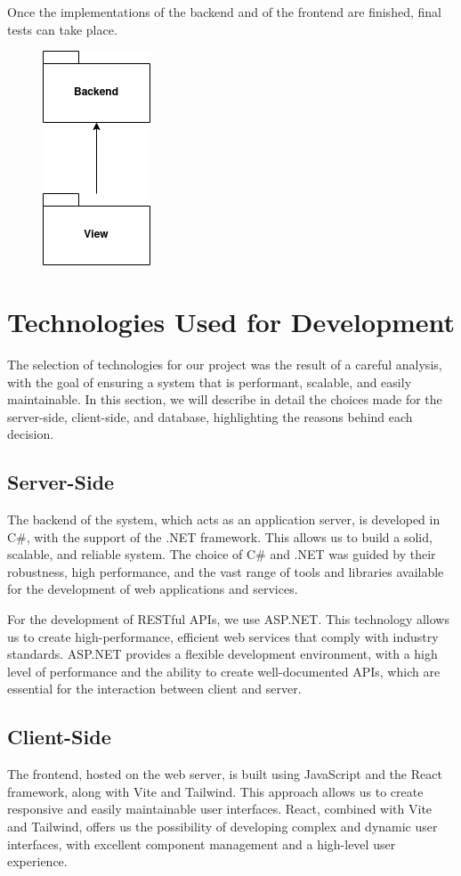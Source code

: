 Once the implementations of the backend and of the frontend are finished, final tests can take place.

\begin{figure}[H]
    \centering
    \includegraphics[width=0.1\linewidth]{../assets/implementation-plan-diagrams/implementation-plan-6.png}
\end{figure}



\section{Technologies Used for Development}
The selection of technologies for our project was the result of a careful analysis, 
with the goal of ensuring a system that is performant, scalable, and easily maintainable. 
In this section, we will describe in detail the choices made for the server-side, 
client-side, and database, highlighting the reasons behind each decision.

\subsection{Server-Side}
The backend of the system, which acts as an application server, is developed in C\#, 
with the support of the .NET framework. This allows us to build a solid, scalable, and reliable system.
The choice of C\# and .NET was guided by their robustness, high performance, and the vast 
range of tools and libraries available for the development of web applications and services.

For the development of RESTful APIs, we use ASP.NET. This technology allows us to create 
high-performance, efficient web services that comply with industry standards.
ASP.NET provides a flexible development environment, with a high level of performance and the 
ability to create well-documented APIs, which are essential for the interaction between client and server.

\subsection{Client-Side}
The frontend, hosted on the web server, is built using JavaScript and the React framework, 
along with Vite and Tailwind. This approach allows us to create responsive and easily maintainable user interfaces.
React, combined with Vite and Tailwind, offers us the possibility of developing complex and dynamic 
user interfaces, with excellent component management and a high-level user experience.

